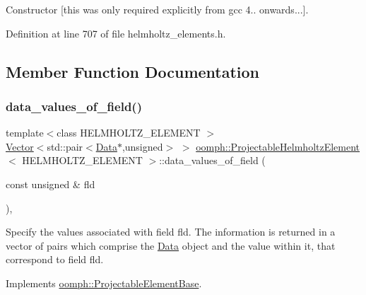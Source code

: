 Constructor \mbox{[}this was only required explicitly from gcc 4.. onwards...\mbox{]}. 



Definition at line 707 of file helmholtz\+\_\+elements.\+h.



\subsection{Member Function Documentation}
\mbox{\label{classoomph_1_1ProjectableHelmholtzElement_a8ca133993658d3eefdfd1ab02b55fae7}} 
\subsubsection{\texorpdfstring{data\+\_\+values\+\_\+of\+\_\+field()}{data\_values\_of\_field()}}
{\footnotesize\ttfamily template$<$class H\+E\+L\+M\+H\+O\+L\+T\+Z\+\_\+\+E\+L\+E\+M\+E\+NT $>$ \\
\hyperlink{classoomph_1_1Vector}{Vector}$<$std\+::pair$<$\hyperlink{classoomph_1_1Data}{Data}$\ast$,unsigned$>$ $>$ \hyperlink{classoomph_1_1ProjectableHelmholtzElement}{oomph\+::\+Projectable\+Helmholtz\+Element}$<$ H\+E\+L\+M\+H\+O\+L\+T\+Z\+\_\+\+E\+L\+E\+M\+E\+NT $>$\+::data\+\_\+values\+\_\+of\+\_\+field (\begin{DoxyParamCaption}\item[{const unsigned \&}]{fld }\end{DoxyParamCaption})\hspace{0.3cm}{\ttfamily [inline]}, {\ttfamily [virtual]}}



Specify the values associated with field fld. The information is returned in a vector of pairs which comprise the \hyperlink{classoomph_1_1Data}{Data} object and the value within it, that correspond to field fld. 



Implements \hyperlink{classoomph_1_1ProjectableElementBase_a644306ebdf16f334344c2d27d72f18b7}{oomph\+::\+Projectable\+Element\+Base}.



